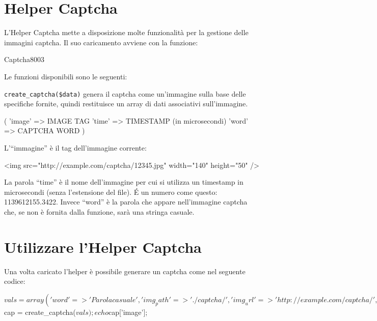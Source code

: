 \section{Helper Captcha}
\label{helper:captcha}

L'Helper Captcha mette a disposizione molte funzionalità per la gestione delle immagini captcha. Il suo caricamento avviene con la funzione:


\begin{img}{Captcha}{8}{003}
\end{img}

Le funzioni disponibili sono le seguenti:

\verb|create_captcha($data)| genera il captcha come un'immagine sulla base delle specifiche fornite, quindi restituisce un array di dati associativi sull'immagine.

\begin{code}
[array]
(
  'image' => IMAGE TAG
  'time'	=> TIMESTAMP (in microsecondi)
  'word'	=> CAPTCHA WORD
)
\end{code}

L'``immagine'' è il tag dell'immagine corrente:

\begin{code}
<img src="http://example.com/captcha/12345.jpg" width="140" height="50" />
\end{code}

La parola ``time'' è il nome dell'immagine per cui si utilizza un timestamp in microsecondi (senza l'estensione del file). \'E un numero come questo: 1139612155.3422. Invece ``word'' è la parola che appare nell'immagine captcha che, se non è fornita dalla funzione, sarà una stringa casuale.


\section*{Utilizzare l'Helper Captcha}

Una volta caricato l'helper è possibile generare un captcha come nel seguente codice:

\begin{code}
$vals = array(
    'word'	 => 'Parola casuale',
    'img_path'	 => './captcha/',
    'img_url'	 => 'http://example.com/captcha/',
    'font_path'	 => './path/to/fonts/texb.ttf',
    'img_width'	 => '150',
    'img_height' => 30,
    'expiration' => 7200
    );

$cap = create_captcha($vals);
echo $cap['image'];
\end{code}

